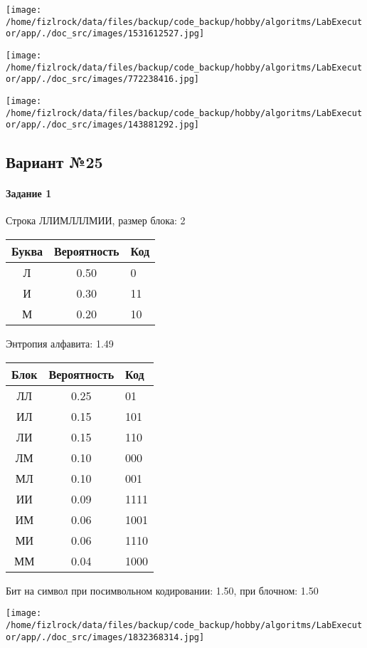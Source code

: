 \documentclass[a4paper, 12pt]{article}
\begin{document}
\texttt{[image: /home/fizlrock/data/files/backup/code\_backup/hobby/algoritms/LabExecutor/app/./doc\_src/images/1531612527.jpg]}

\texttt{[image: /home/fizlrock/data/files/backup/code\_backup/hobby/algoritms/LabExecutor/app/./doc\_src/images/772238416.jpg]}

\texttt{[image: /home/fizlrock/data/files/backup/code\_backup/hobby/algoritms/LabExecutor/app/./doc\_src/images/143881292.jpg]}
\pagebreak
\subsection{Вариант №25}
\paragraph{Задание 1}

Строка ЛЛИМЛЛЛМИИ, размер блока: 2
\begin{center}
 \begin{tabular}{ |c|c|l| } 
  \hline
     Буква & Вероятность & Код\\ \hline
Л & 0.50 & 0\\\hline
И & 0.30 & 11\\\hline
М & 0.20 & 10
\\ \hline \end{tabular}
\end{center}
Энтропия алфавита: 1.49
\begin{center}
 \begin{tabular}{ |c|c|l| } 
  \hline
     Блок & Вероятность & Код\\ \hline
ЛЛ & 0.25 & 01\\\hline
ИЛ & 0.15 & 101\\\hline
ЛИ & 0.15 & 110\\\hline
ЛМ & 0.10 & 000\\\hline
МЛ & 0.10 & 001\\\hline
ИИ & 0.09 & 1111\\\hline
ИМ & 0.06 & 1001\\\hline
МИ & 0.06 & 1110\\\hline
ММ & 0.04 & 1000
\\ \hline \end{tabular}
\end{center}
Бит на символ при посимвольном кодировании: 1.50, при блочном: 1.50

\texttt{[image: /home/fizlrock/data/files/backup/code\_backup/hobby/algoritms/LabExecutor/app/./doc\_src/images/1832368314.jpg]}
\end{document}

